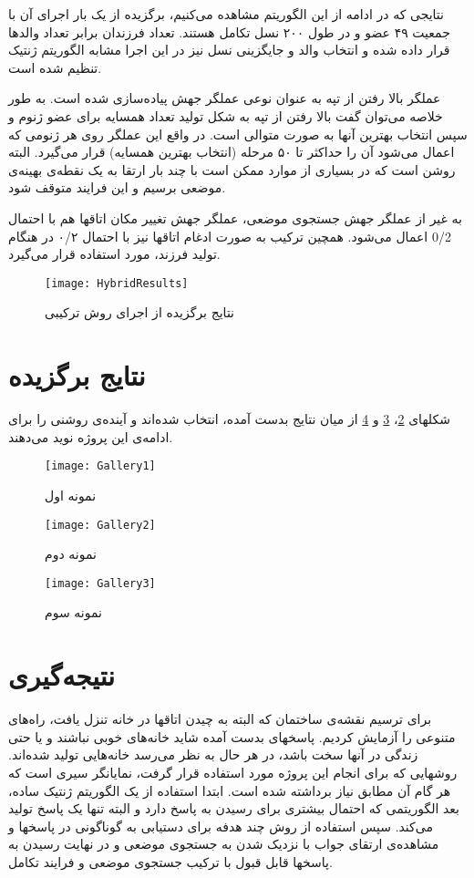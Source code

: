 \documentclass{report}
\begin{document}
نتایجی که در ادامه از این الگوریتم مشاهده می‌کنیم، برگزیده از یک بار اجرای آن با جمعیت ۴۹ عضو و در طول ۲۰۰ نسل تکامل هستند. تعداد فرزندان برابر تعداد والدها قرار داده شده و انتخاب والد و جایگزینی نسل نیز در این اجرا مشابه الگوریتم ژنتیک تنظیم شده است.

عملگر بالا رفتن از تپه به عنوان نوعی عملگر جهش پیاده‌سازی شده است. به طور خلاصه می‌توان گفت بالا رفتن از تپه به شکل تولید تعداد همسایه برای عضو ژنوم و سپس انتخاب بهترین آنها به صورت متوالی است. در واقع این عملگر روی هر ژنومی که اعمال می‌شود آن را حداکثر تا ۵۰ مرحله (انتخاب بهترین همسایه) قرار می‌گیرد. البته روشن است که در بسیاری از موارد ممکن است با چند بار ارتقا به یک نقطه‌ی بهینه‌ی موضعی برسیم و این فرایند متوقف شود.

به غیر از عملگر جهش جستجوی موضعی، عملگر جهش تغییر مکان اتاقها هم با احتمال 0/2 اعمال می‌شود. همچین ترکیب به صورت ادغام اتاقها نیز با احتمال ۰/۲ در هنگام تولید فرزند، مورد استفاده قرار می‌گیرد.

\begin{figure} \centerline{\texttt{[image: HybridResults]}} \caption{\label{fHybridResults}
نتایج برگزیده از اجرای روش ترکیبی
} \end{figure}

\section{نتایج برگزیده}
شکلهای \ref{fGallery1}، \ref{fGallery2} و \ref{fGallery3} از میان نتایج بدست آمده، انتخاب شده‌اند و آینده‌ی روشنی را برای ادامه‌ی این پروژه نوید می‌دهند.  

\begin{figure}[!h] \centerline{\texttt{[image: Gallery1]}} \caption{\label{fGallery1}
نمونه اول
} \end{figure}

\begin{figure} \centerline{\texttt{[image: Gallery2]}} \caption{\label{fGallery2}
نمونه دوم
} \end{figure}

\begin{figure} \centerline{\texttt{[image: Gallery3]}} \caption{\label{fGallery3}
نمونه سوم
} \end{figure}

\section{نتیجه‌گیری}
برای ترسیم نقشه‌ی ساختمان که البته به چیدن اتاقها در خانه تنزل یافت، راه‌های متنوعی را آزمایش کردیم. پاسخهای بدست آمده شاید خانه‌های خوبی نباشند و یا حتی زندگی در آنها سخت باشد، در هر حال به نظر می‌رسد خانه‌هایی تولید شده‌اند. روشهایی که برای انجام این پروژه مورد استفاده قرار گرفت، نمایانگر سیری است که هر گام آن مطابق نیاز برداشته شده است. ابتدا استفاده از یک الگوریتم ژنتیک ساده، بعد الگوریتمی که احتمال بیشتری برای رسیدن به پاسخ دارد و البته تنها یک پاسخ تولید می‌کند. سپس استفاده از روش چند هدفه برای دستیابی به گوناگونی در پاسخها و مشاهده‌ی ارتقای جواب با نزدیک شدن به جستجوی موضعی و در نهایت رسیدن به پاسخها قابل قبول با ترکیب جستجوی موضعی و فرایند تکامل.
   
\end{document}
